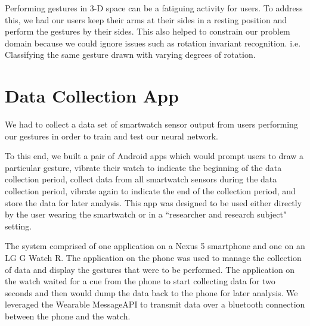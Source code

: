 \documentclass{report}
\begin{document}
Performing gestures in 3-D space can be a fatiguing activity for users. To address this, we had our users keep their arms at their sides in a resting position and perform the gestures by their sides. This also helped to constrain our problem domain because we could ignore issues such as rotation invariant recognition. i.e. Classifying the same gesture drawn with varying degrees of rotation.

\section{Data Collection App}

We had to collect a data set of smartwatch sensor output from users performing our gestures in order to train and test our neural network.

To this end, we built a pair of Android apps which would prompt users to draw a particular gesture, vibrate their watch to indicate the beginning of the data collection period, collect data from all smartwatch sensors during the data collection period, vibrate again to indicate the end of the collection period, and store the data for later analysis. This app was designed to be used either directly by the user wearing the smartwatch or in a ``researcher and research subject" setting.

The system comprised of one application on a Nexus 5 smartphone and one on an LG G Watch R. The application on the phone was used to manage the collection of data and display the gestures that were to be performed. The application on the watch waited for a cue from the phone to start collecting data for two seconds and then would dump the data back to the phone for later analysis. We leveraged the Wearable MessageAPI to transmit data over a bluetooth connection between the phone and the watch.
\end{document}
